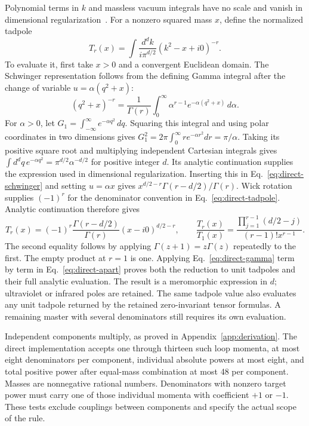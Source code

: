 Polynomial terms in $k$ and massless vacuum integrals have no scale and vanish in dimensional regularization~\cite{Weinzierl2022}. For a nonzero squared mass $x$, define the normalized tadpole
\begin{equation}
 T_r(x)=\int\frac{d^dk}{i\pi^{d/2}}(k^2-x+i0)^{-r}.
 \label{eq:direct-tadpole}
\end{equation}
To evaluate it, first take $x>0$ and a convergent Euclidean domain. The Schwinger representation follows from the defining Gamma integral after the change of variable $u=\alpha(q^2+x)$:
\begin{equation}
 (q^2+x)^{-r}=\frac{1}{\Gamma(r)}\int_0^\infty
 \alpha^{r-1}e^{-\alpha(q^2+x)}\,d\alpha.
 \label{eq:direct-schwinger}
\end{equation}
For $\alpha>0$, let $G_1=\int_{-\infty}^{\infty}e^{-\alpha q^2}\,dq$. Squaring this integral and using polar coordinates in two dimensions gives $G_1^2=2\pi\int_0^\infty r e^{-\alpha r^2}dr=\pi/\alpha$. Taking its positive square root and multiplying independent Cartesian integrals gives $\int d^dq\,e^{-\alpha q^2}=\pi^{d/2}\alpha^{-d/2}$ for positive integer $d$. Its analytic continuation supplies the expression used in dimensional regularization. Inserting this in Eq.~\eqref{eq:direct-schwinger} and setting $u=\alpha x$ gives $x^{d/2-r}\Gamma(r-d/2)/\Gamma(r)$. Wick rotation supplies $(-1)^r$ for the denominator convention in Eq.~\eqref{eq:direct-tadpole}. Analytic continuation therefore gives
\begin{equation}
 T_r(x)=(-1)^r\frac{\Gamma(r-d/2)}{\Gamma(r)}(x-i0)^{d/2-r},\qquad
 \frac{T_r(x)}{T_1(x)}=
 \frac{\prod_{j=1}^{r-1}(d/2-j)}{(r-1)!x^{r-1}}.
 \label{eq:direct-gamma}
\end{equation}
The second equality follows by applying $\Gamma(z+1)=z\Gamma(z)$ repeatedly to the first. The empty product at $r=1$ is one. Applying Eq.~\eqref{eq:direct-gamma} term by term in Eq.~\eqref{eq:direct-apart} proves both the reduction to unit tadpoles and their full analytic evaluation. The result is a meromorphic expression in $d$; ultraviolet or infrared poles are retained. The same tadpole value also evaluates any unit tadpole returned by the retained zero-invariant tensor formulas. A remaining master with several denominators still requires its own evaluation.

Independent components multiply, as proved in Appendix~\ref{app:derivation}. The direct implementation accepts one through thirteen such loop momenta, at most eight denominators per component, individual absolute powers at most eight, and total positive power after equal-mass combination at most 48 per component. Masses are nonnegative rational numbers. Denominators with nonzero target power must carry one of those individual momenta with coefficient $+1$ or $-1$. These tests exclude couplings between components and specify the actual scope of the rule.

